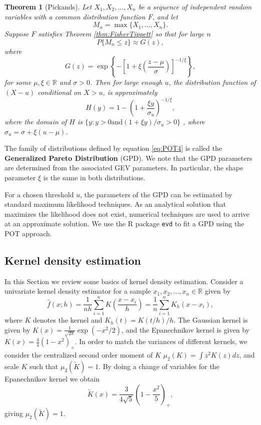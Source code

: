 \documentclass[11pt,a4paper,]{article}
\newtheorem{theorem}{Theorem}[section]
\theoremstyle{definition}
\theoremstyle{definition}
\theoremstyle{definition}
\theoremstyle{remark}
\begin{document}
\begin{theorem}[Pickands] Let $X_1,  X_2, \dots,  X_n$ be a sequence of independent random variables with a common distribution function $F$, and let
    $$ M_n = \max \{X_1, \dots, X_n \}  . $$
    Suppose $F$ satisfies Theorem \ref{thm:FisherTippett} so that for large $n$
    $$ P\{ M_n \leq z \} \approx G(z) , $$
    where
    $$ G(z) = \exp\left\{ -\left[ 1 + \xi\left(\frac{z - \mu}{\sigma} \right)\right]^{-1/\xi} \right\} , $$
    for some $\mu, \xi \in \mathbb{R}$ and $\sigma >0$. Then for large enough $u$, the distribution function of $(X-u)$ conditional on $X > u$, is approximately
    \begin{equation}\label{eq:POT4}
        H(y) = 1 - \left( 1 + \frac{\xi y}{\sigma_u} \right)^{-1/\xi} ,
    \end{equation}
    where the domain of $H$ is $\{y: y >0  \text{and}   (1 + \xi y)/\sigma_u >0 \}$ , where $\sigma_u = \sigma + \xi(u- \mu)$.
\end{theorem}

The family of distributions defined by equation \eqref{eq:POT4} is called the \textbf{Generalized Pareto Distribution} (GPD). We note that the GPD parameters are determined from the associated GEV parameters. In particular, the shape parameter \(\xi\) is the same in both distributions.

For a chosen threshold \(u\), the parameters of the GPD can be estimated by standard maximum likelihood techniques. As an analytical solution that maximizes the likelihood does not exist, numerical techniques are used to arrive at an approximate solution. We use the R package \texttt{evd} to fit a GPD using the POT approach.

\hypertarget{subsec:kde}{%
\subsection{Kernel density estimation}\label{subsec:kde}}

In this Section we review some basics of kernel density estimation. Consider a univariate kernel density estimator for a sample \(x_1, x_2, \dots, x_n \in \mathbb{R}\) given by
\begin{equation}\label{eq:kde1}
    \hat{f}(x;h) = \frac{1}{nh}\sum_{i=1}^n K\left(\frac{x-x_i}{h}\right) = \frac{1}{n} \sum_{i=1}^n K_h(x-x_i) ,
\end{equation}
where \(K\) denotes the kernel and \(K_h(t) = K(t/h)/h\). The Gaussian kernel is given by \(K(x) = \frac{1}{\sqrt{2\pi }}\exp(-x^2/2)\), and the Epanechnikov kernel is given by \(K(x) = \frac{3}{4}\left(1 - x^2 \right)_+\).
In order to match the variances of different kernels, we consider the centralized second order moment of \(K\)
\(\mu_2(K) = \int z^2 K(z) dz\), and scale \(K\) such that \(\mu_2(\tilde{K}) = 1\). By doing a change of variables for the Epanechnikov kernel we obtain
\begin{equation}\label{eq:kde5}
    \tilde{K}(x) = \frac{3}{4 \sqrt{5}}\left(1 - \frac{x^2}{5} \right)_+  ,
\end{equation}
giving \(\mu_2(\tilde{K}) = 1\).
\end{document}
